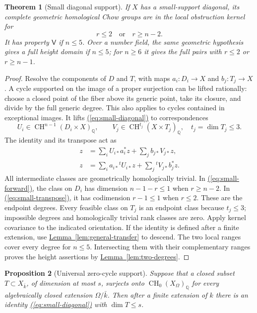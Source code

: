 \documentclass[11pt,a4paper]{article}
\newtheorem{theorem}{Theorem}[section]
\newtheorem{proposition}[theorem]{Proposition}
\theoremstyle{definition}
\theoremstyle{remark}\newtheorem{remark}[theorem]{Remark}
\numberwithin{equation}{section}
\newcommand{\Q}{\mathbb Q}\newcommand{\R}{\mathbb R}\newcommand{\C}{\mathbb C}
\newcommand{\CH}{\operatorname{CH}}\newcommand{\an}{\mathrm{an}}
\newcommand{\lemref}[1]{\hyperref[#1]{\textcolor{resultlink}{Lemma~\ref*{#1}}}}
\renewcommand{\eqref}[1]{\hyperref[#1]{\textcolor{equationlink}{(\ref*{#1})}}}
\begin{document}
\begin{theorem}[Small diagonal support]\label{thm:small-support}
If $X$ has a small-support diagonal, its complete geometric homological
Chow groups are in the local obstruction kernel for
\begin{equation}\label{eq:small-support-range}
 r\leq2\quad\text{or}\quad r\geq n-2.
\end{equation}
It has property $\mathsf V$ if $n\leq5$. Over a number field, the
same geometric hypothesis gives a full height domain if $n\leq5$;
for $n\geq6$ it gives the full pairs with $r\leq2$ or $r\geq n-1$.
\end{theorem}

\begin{proof}
Resolve the components of $D$ and $T$, with maps $a_i:D_i\to X$ and
$b_j:T_j\to X$. A cycle supported on the image of a proper surjection
can be lifted rationally: choose a closed point of the fiber above its
generic point, take its closure, and divide by the full generic
degree. This also applies to cycles contained in exceptional images.
It lifts \eqref{eq:small-diagonal} to correspondences
\[
 U_i\in\CH^{n-1}(D_i\times X)_\Q,\qquad
 V_j\in\CH^{t_j}(X\times T_j)_\Q,\quad t_j=\dim T_j\leq3.
\]
The identity and its transpose act as
\begin{align}
 z&=\sum_iU_{i*}a_i^*z+\sum_jb_{j*}V_{j*}z,
       \label{eq:small-forward}\\
 z&=\sum_i a_{i*}{}^tU_{i*}z+\sum_j{}^tV_{j*}b_j^*z.
       \label{eq:small-transpose}
\end{align}
All intermediate classes are geometrically homologically trivial.
In \eqref{eq:small-forward}, the class on $D_i$ has dimension
$n-1-r\leq1$ when $r\geq n-2$. In
\eqref{eq:small-transpose}, it has codimension $r-1\leq1$ when
$r\leq2$. These are the endpoint degrees. Every feasible class on
$T_j$ is an endpoint class because $t_j\leq3$; impossible degrees
and homologically trivial rank classes are zero. Apply kernel
covariance to the indicated orientation. If the identity is defined
after a finite extension, use \lemref{lem:general-transfer} to descend.
The two local ranges cover every degree for $n\leq5$. Intersecting
them with their complementary ranges proves the height assertions
by \lemref{lem:two-degrees}.
\end{proof}

\begin{proposition}[Universal zero-cycle support]\label{prop:universal-support}
Suppose that a closed subset $T\subset X_{\bar k}$, of dimension at
most $s$, surjects onto $\CH_0(X_\Omega)_\Q$ for every algebraically
closed extension $\Omega/\bar k$. Then after a finite extension of
$k$ there is an identity \eqref{eq:small-diagonal} with $\dim T\leq s$.
\end{proposition}
\end{document}
